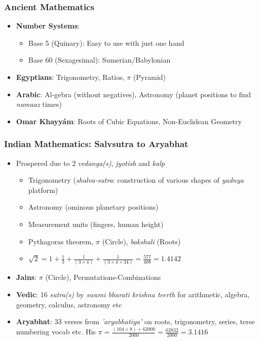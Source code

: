 \begin{frame}[fragile]
\frametitle{Ancient Mathematics}
\begin{itemize}[label=\textbullet,noitemsep,nolistsep]
\item \textbf{Number Systems}:
	\begin{itemize}[label=\textbullet, noitemsep,nolistsep]
	\item Base 5 (Quinary): Easy to use with just one hand
	\item Base 60 (Sexagesimal): Sumerian/Babylonian
	\end{itemize}
\item \textbf{Egyptians}: Trigonometry, Ratios, $\pi$ (Pyramid)
\item \textbf{Arabic}: Al-gebra (without negatives), Astronomy (planet positions to find {\it namaaz} times)
\item \textbf{Omar Khayy\'am}: Roots of Cubic Equations, Non-Euclidean Geometry
\end{itemize}
\end{frame}

\begin{frame}[fragile]
\frametitle{Indian Mathematics: Salvsutra to Aryabhat}
\begin{itemize}[label=\textbullet,noitemsep,nolistsep]
\item Prospered due to 2 {\it vedanga(s)}, {\it jyotish} and {\it kalp}
	\begin{itemize}[label=\textbullet, noitemsep,nolistsep]
	\item Trigonometry ({\it shalva-sutra}: construction of various shapes of {\it yadnya} platform)
	\item Astronomy (ominous planetary positions)
	\item Measurement units (fingers, human height)
	\item Pythagoras theorem, $\pi$ (Circle), {\it bakshali} (Roots)
	\item $\sqrt{2} = 1 + \frac{1}{3} + \frac{1}{(3 \times 4)} + \frac{1}{(3 \times 4 \times 34)} = \frac{577}{408} = 1.4142$
	\end{itemize}
\item \textbf{Jains}: $\pi$ (Circle), Permutations-Combinations
\item \textbf{Vedic}: 16 {\it sutra(s)} by {\it swami bharati krishna teerth} for  arithmetic, algebra, geometry, calculus, astronomy etc
\item \textbf{Aryabhat}: 33 verses from {\it 'aryabhatiya'} on roots, trigonometry, series, terse numbering vocab etc. His $\pi =  \frac{(104 \times 8)+62000}{2000} = \frac{62832}{2000} = 3.1416$
\end{itemize}
\end{frame}

